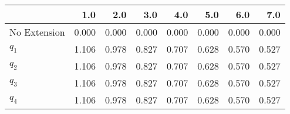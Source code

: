 \begin{tabular}{lrrrrrrr}
\toprule
{} &   1.0 &   2.0 &   3.0 &   4.0 &   5.0 &   6.0 &   7.0 \\
\midrule
No Extension & 0.000 & 0.000 & 0.000 & 0.000 & 0.000 & 0.000 & 0.000 \\
$q_1$        & 1.106 & 0.978 & 0.827 & 0.707 & 0.628 & 0.570 & 0.527 \\
$q_2$        & 1.106 & 0.978 & 0.827 & 0.707 & 0.628 & 0.570 & 0.527 \\
$q_3$        & 1.106 & 0.978 & 0.827 & 0.707 & 0.628 & 0.570 & 0.527 \\
$q_4$        & 1.106 & 0.978 & 0.827 & 0.707 & 0.628 & 0.570 & 0.527 \\
\bottomrule
\end{tabular}

